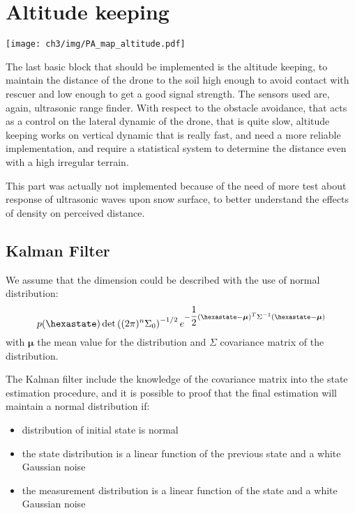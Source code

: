 \section{Altitude keeping}
\begin{marginfigure}
	\centering
	\texttt{[image: ch3/img/PA\_map\_altitude.pdf]}
\end{marginfigure}
The last basic block that should be implemented is the altitude keeping, to maintain the distance of the drone to the soil high enough to avoid contact with rescuer and low enough to get a good signal strength. The sensors used are, again, ultrasonic range finder. With respect to the obstacle avoidance, that acts as a control on the lateral dynamic of the drone, that is quite slow, altitude keeping works on vertical dynamic that is really fast, and need a more reliable implementation, and require a statistical system to determine the distance even with a high irregular terrain.

This part was actually not implemented because of the need of more test about response of ultrasonic waves upon snow surface, to better understand the effects of density on perceived distance.

\subsection{Kalman Filter}
We assume that the dimension could be described with the use of normal distribution:
\begin{equation}
p(\hexastate) \det\braces{(2\pi)^{n}\Sigma_0}^{-1/2} e^{-\dfrac{1}{2}\braces{\hexastate - \boldsymbol{\mu}}^T \Sigma^{-1}\braces{\hexastate - \boldsymbol{\mu}}}
\end{equation}
with ${\boldsymbol{\mu}}$ the mean value for the distribution and ${\Sigma}$ covariance matrix of the distribution.

The Kalman filter include the knowledge of the covariance matrix into the state estimation procedure, and it is possible to proof that the final estimation will maintain a normal distribution if:
\begin{itemize}
\item distribution of initial state is normal
\item the state distribution is a linear function of the previous state and a white Gaussian noise
\item the measurement distribution  is a linear function of the state and a white Gaussian noise
\end{itemize}

